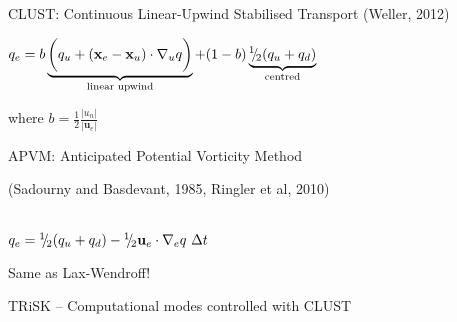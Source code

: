 \begin{frame}

\begin{block}{CLUST: \small\normalfont Continuous Linear-Upwind Stabilised Transport {\footnotesize (Weller, 2012)}}

$q_e = b
\underbrace{\biggl(
    q_u + (\mathbf{x}_e-\mathbf{x}_u)\cdot \nabla_u q
\biggr)}_{\text{linear upwind}}
+ (1-b)
\underbrace{
    {^1\negthickspace/\negthinspace_2} (q_u + q_d)
}_{\text{centred}}
$

where $b = \frac{1}{2}\frac{|u_n|}{|\mathbf{u}_e|}$

\end{block}

\begin{block}{APVM: Anticipated Potential Vorticity Method}

\begin{minipage}{0.53\linewidth}\raggedright
(Sadourny and Basdevant, 1985, Ringler et al, 2010)

\ \\

$q_e = {^1\negthickspace/\negthinspace_2}(q_u + q_d) - {^1\negthickspace/\negthinspace_2}\mathbf{u}_e\cdot\nabla_e q~\Delta t$
\end{minipage}
\hfill
\begin{minipage}{0.45\linewidth}

\end{minipage}

Same as Lax-Wendroff!
\end{block}

\pause
TRiSK -- Computational modes controlled with CLUST \tick \smiley

\end{frame}

